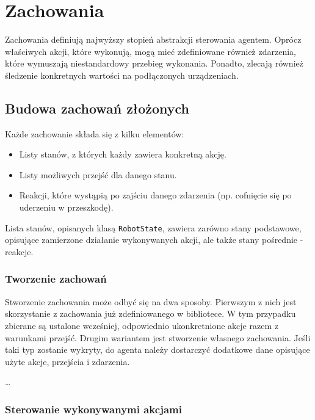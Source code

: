 \chapter{Zachowania}
\label{ch:zachowania}

Zachowania definiują najwyższy stopień abstrakcji sterowania agentem. Oprócz właściwych akcji, które wykonują, mogą mieć zdefiniowane również zdarzenia, które wymuszają niestandardowy przebieg wykonania. Ponadto, zlecają również śledzenie konkretnych wartości na podłączonych urządzeniach.

\section{Budowa zachowań złożonych}

Każde zachowanie składa się z kilku elementów:
\begin{itemize}
    \item Listy stanów, z których każdy zawiera konkretną akcję.
    \item Listy możliwych przejść dla danego stanu.
    \item Reakcji, które wystąpią po zajściu danego zdarzenia (np. cofnięcie się po uderzeniu w przeszkodę).
\end{itemize}

Lista stanów, opisanych klasą {\tt RobotState}, zawiera zarówno stany podstawowe, opisujące zamierzone działanie wykonywanych akcji, ale także stany pośrednie - reakcje.

\subsection{Tworzenie zachowań}

Stworzenie zachowania może odbyć się na dwa sposoby. Pierwszym z nich jest skorzystanie z zachowania już zdefiniowanego w bibliotece. W tym przypadku zbierane są ustalone wcześniej, odpowiednio ukonkretnione akcje razem z warunkami przejść. Drugim wariantem jest stworzenie własnego zachowania. Jeśli taki typ zostanie wykryty, do agenta należy dostarczyć dodatkowe dane opisujące użyte akcje, przejścia i zdarzenia.

\ldots


\subsection{Sterowanie wykonywanymi akcjami}


